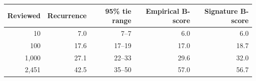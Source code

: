 \begin{tabular}{rrrrr}\toprule
Reviewed & Recurrence & 95\% tie range & Empirical B-score & Signature B-score \\ \midrule
10 & 7.0 & 7--7 & 6.0 & 6.0 \\
100 & 17.6 & 17--19 & 17.0 & 18.7 \\
1,000 & 27.1 & 22--33 & 29.6 & 32.0 \\
2,451 & 42.5 & 35--50 & 57.0 & 56.7 \\
\bottomrule\end{tabular}
